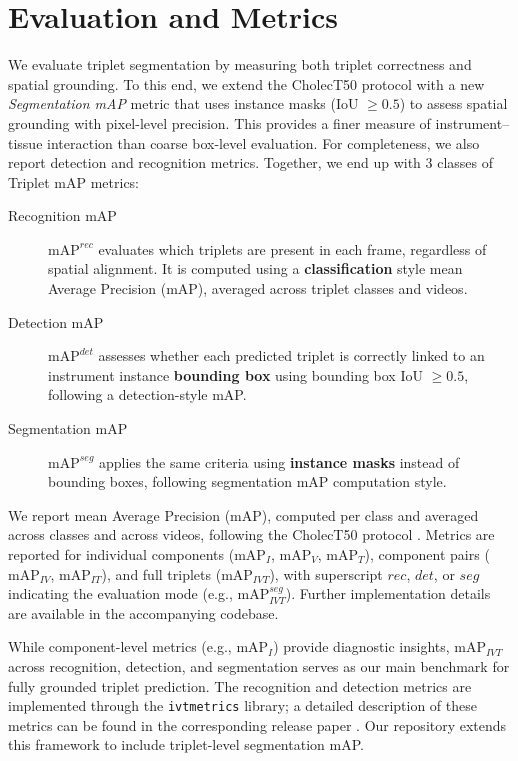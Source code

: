 \documentclass[11pt]{article}
\newcommand{\mAP}{\textrm{mAP}}
\begin{document}
\section{Evaluation and Metrics}
\label{sec:evaluation}
We evaluate triplet segmentation by measuring both triplet correctness and spatial grounding. To this end, we extend the CholecT50 protocol \cite{nwoye2022rendezvous} with a new \emph{Segmentation mAP} metric that uses instance masks (IoU $\geq 0.5$) to assess spatial grounding with pixel-level precision. 
This provides a finer measure of instrument–tissue interaction than coarse box-level evaluation. For completeness, we also report detection and recognition metrics.
Together, we end up with 3 classes of Triplet mAP metrics:
\begin{description}
\item[Recognition mAP] 
$\mAP^{rec}$ evaluates which triplets are present in each frame, regardless of spatial alignment. 
It is computed using a \textbf{classification} style mean Average Precision (mAP), averaged across triplet classes and videos.  

\item[Detection mAP]
$\mAP^{det}$ assesses whether each predicted triplet is correctly linked to an instrument instance \textbf{bounding box} using bounding box IoU $\geq 0.5$, following a detection-style mAP.  

\item[Segmentation mAP]
$\mAP^{seg}$ applies the same criteria using \textbf{instance masks} instead of bounding boxes, following segmentation mAP computation style.
\end{description}

We report mean Average Precision (mAP), computed per class and averaged across classes and across videos, following the CholecT50 protocol \cite{nwoye2022rendezvous}. Metrics are reported for individual components ($\mAP_I$, $\mAP_V$, $\mAP_T$), component pairs ($\mAP_{IV}$, $\mAP_{IT}$), and full triplets ($\mAP_{IVT}$), with superscript $rec$, $det$, or $seg$ indicating the evaluation mode (e.g., $\mAP_{IVT}^{seg}$). Further implementation details are available in the accompanying codebase.


While component-level metrics (e.g., $\mAP_{I}$) provide diagnostic insights, $\mAP_{IVT}$ across recognition, detection, and segmentation serves as our main benchmark for fully grounded triplet prediction. The recognition and detection metrics are implemented through the \texttt{ivtmetrics} library; a detailed description of these metrics can be found in the corresponding release paper \cite{nwoye2023datasplitsmetricsmethod}. Our repository extends this framework to include triplet-level segmentation mAP.
\end{document}
